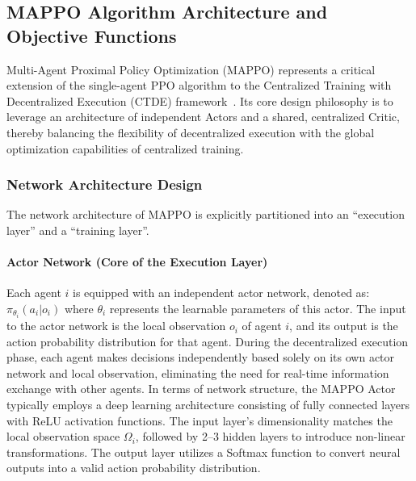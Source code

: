 \subsection{MAPPO Algorithm Architecture and Objective Functions}

Multi-Agent Proximal Policy Optimization (MAPPO) represents a critical extension of the single-agent PPO algorithm to the Centralized Training with Decentralized Execution (CTDE) framework~\cite{yuSurprisingEffectivenessPPO2022}. Its core design philosophy is to leverage an architecture of independent Actors and a shared, centralized Critic, thereby balancing the flexibility of decentralized execution with the global optimization capabilities of centralized training.

\subsubsection*{Network Architecture Design}
The network architecture of MAPPO is explicitly partitioned into an ``execution layer'' and a ``training layer''.

\paragraph{Actor Network (Core of the Execution Layer)}
Each agent $i$ is equipped with an independent actor network, denoted as:
$\pi_{\theta_i}(a_i|o_i)$
where $\theta_i$ represents the learnable parameters of this actor. The input to the actor network is the local observation $o_i$ of agent $i$, and its output is the action probability distribution for that agent. During the decentralized execution phase, each agent makes decisions independently based solely on its own actor network and local observation, eliminating the need for real-time information exchange with other agents. In terms of network structure, the MAPPO Actor typically employs a deep learning architecture consisting of fully connected layers with ReLU activation functions. The input layer's dimensionality matches the local observation space $\Omega_i$, followed by 2--3 hidden layers to introduce non-linear transformations. The output layer utilizes a Softmax function to convert neural outputs into a valid action probability distribution.

